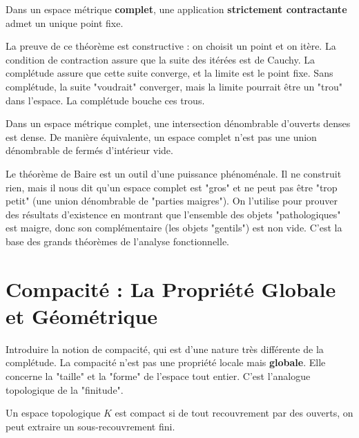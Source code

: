 \begin{theorem}
    Dans un espace métrique \textbf{complet}, une application \textbf{strictement contractante} admet un unique point fixe.
\end{theorem}

\begin{remark}
    La preuve de ce théorème est constructive : on choisit un point et on itère. La condition de contraction assure que la suite des itérées est de Cauchy. La complétude assure que cette suite converge, et la limite est le point fixe. Sans complétude, la suite "voudrait" converger, mais la limite pourrait être un "trou" dans l'espace. La complétude bouche ces trous.
\end{remark}

\begin{theorem}
    Dans un espace métrique complet, une intersection dénombrable d'ouverts denses est dense. De manière équivalente, un espace complet n'est pas une union dénombrable de fermés d'intérieur vide.
\end{theorem}

\begin{remark}
    Le théorème de Baire est un outil d'une puissance phénoménale. Il ne construit rien, mais il nous dit qu'un espace complet est "gros" et ne peut pas être "trop petit" (une union dénombrable de "parties maigres"). On l'utilise pour prouver des résultats d'existence en montrant que l'ensemble des objets "pathologiques" est maigre, donc son complémentaire (les objets "gentils") est non vide. C'est la base des grands théorèmes de l'analyse fonctionnelle.
\end{remark}

\section{Compacité : La Propriété Globale et Géométrique}

\begin{objectif}
    Introduire la notion de compacité, qui est d'une nature très différente de la complétude. La compacité n'est pas une propriété locale mais \textbf{globale}. Elle concerne la "taille" et la "forme" de l'espace tout entier. C'est l'analogue topologique de la "finitude".
\end{objectif}

\begin{definition}
    Un espace topologique $K$ est compact si de tout recouvrement par des ouverts, on peut extraire un sous-recouvrement fini.
\end{definition}

